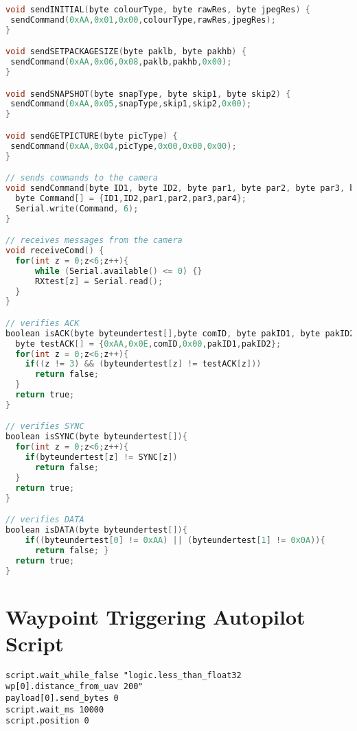 \begin{lstlisting}[language=C, label = lst:arduino_captureTest, caption = {Arduino code, used up until the point we started using the Il Matto. This was written in the arduino-022 IDE}]
void sendINITIAL(byte colourType, byte rawRes, byte jpegRes) {
 sendCommand(0xAA,0x01,0x00,colourType,rawRes,jpegRes);
}

void sendSETPACKAGESIZE(byte paklb, byte pakhb) {
 sendCommand(0xAA,0x06,0x08,paklb,pakhb,0x00);
}

void sendSNAPSHOT(byte snapType, byte skip1, byte skip2) {
 sendCommand(0xAA,0x05,snapType,skip1,skip2,0x00);
}

void sendGETPICTURE(byte picType) {
 sendCommand(0xAA,0x04,picType,0x00,0x00,0x00);
}

// sends commands to the camera
void sendCommand(byte ID1, byte ID2, byte par1, byte par2, byte par3, byte par4) {
  byte Command[] = {ID1,ID2,par1,par2,par3,par4};
  Serial.write(Command, 6);
}

// receives messages from the camera
void receiveComd() {
  for(int z = 0;z<6;z++){
      while (Serial.available() <= 0) {}
      RXtest[z] = Serial.read();
  }
}

// verifies ACK
boolean isACK(byte byteundertest[],byte comID, byte pakID1, byte pakID2){
  byte testACK[] = {0xAA,0x0E,comID,0x00,pakID1,pakID2};
  for(int z = 0;z<6;z++){
    if((z != 3) && (byteundertest[z] != testACK[z]))
      return false;
  }
  return true;
}

// verifies SYNC
boolean isSYNC(byte byteundertest[]){
  for(int z = 0;z<6;z++){
    if(byteundertest[z] != SYNC[z])
      return false;
  }
  return true;
}

// verifies DATA
boolean isDATA(byte byteundertest[]){
    if((byteundertest[0] != 0xAA) || (byteundertest[1] != 0x0A)){
      return false; }
  return true;
}
\end{lstlisting}

\section{Waypoint Triggering Autopilot Script}

\begin{lstlisting}[label = lst:wp_trigger, caption = {Waypoint triggering code written for the SkyCircuits autopilot. The send\_bytes command is sent when the payload is within 200 meters of waypoint 0. The code will then wait 10 seconds before running again.}]
script.wait_while_false "logic.less_than_float32 wp[0].distance_from_uav 200"
payload[0].send_bytes 0
script.wait_ms 10000
script.position 0
\end{lstlisting}